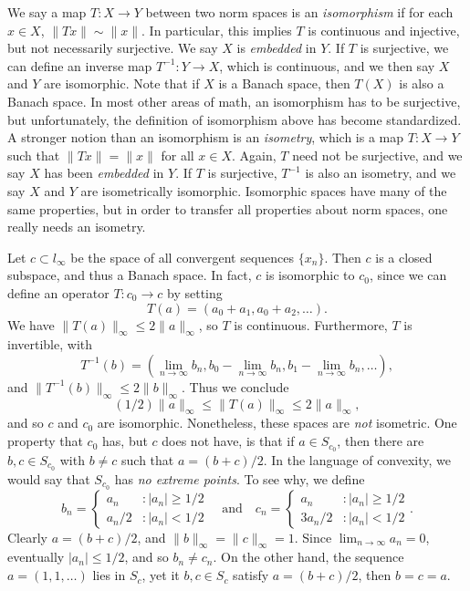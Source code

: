 We say a map $T: X \to Y$ between two norm spaces is an {\it isomorphism} if for each $x \in X$, $\| Tx \| \sim \| x \|$. In particular, this implies $T$ is continuous and injective, but not necessarily surjective. We say $X$ is {\it embedded} in $Y$. If $T$ is surjective, we can define an inverse map $T^{-1}: Y \to X$, which is continuous, and we then say $X$ and $Y$ are isomorphic. Note that if $X$ is a Banach space, then $T(X)$ is also a Banach space. In most other areas of math, an isomorphism has to be surjective, but unfortunately, the definition of isomorphism above has become standardized. A stronger notion than an isomorphism is an {\it isometry}, which is a map $T: X \to Y$ such that $\| Tx \| = \| x \|$ for all $x \in X$. Again, $T$ need not be surjective, and we say $X$ has been {\it embedded} in $Y$. If $T$ is surjective, $T^{-1}$ is also an isometry, and we say $X$ and $Y$ are isometrically isomorphic. Isomorphic spaces have many of the same properties, but in order to transfer all properties about norm spaces, one really needs an isometry.

\begin{example}
    Let $c \subset l_\infty$ be the space of all convergent sequences $\{ x_n \}$. Then $c$ is a closed subspace, and thus a Banach space. In fact, $c$ is isomorphic to $c_0$, since we can define an operator $T: c_0 \to c$ by setting
    \[ T(a) = (a_0 + a_1,a_0 + a_2,\dots). \]
    We have $\| T(a) \|_\infty \leq 2 \| a \|_\infty$, so $T$ is continuous. Furthermore, $T$ is invertible, with
    \[ T^{-1}(b) = \left( \lim_{n \to \infty} b_n, b_0 - \lim_{n \to \infty} b_n, b_1 - \lim_{n \to \infty} b_n, \dots \right), \]
    and $\| T^{-1}(b) \|_\infty \leq 2 \| b \|_\infty$. Thus we conclude
    \[ (1/2) \| a \|_\infty \leq \| T(a) \|_\infty \leq 2 \| a \|_\infty, \]
    and so $c$ and $c_0$ are isomorphic. Nonetheless, these spaces are {\it not} isometric. One property that $c_0$ has, but $c$ does not have, is that if $a \in S_{c_0}$, then there are $b, c \in S_{c_0}$ with $b \neq c$ such that $a = (b + c)/2$. In the language of convexity, we would say that $S_{c_0}$ has {\it no extreme points}. To see why, we define
    \[ b_n = \begin{cases} a_n &: |a_n| \geq 1/2 \\ a_n/2 &: |a_n| < 1/2 \end{cases}\quad\text{and}\quad c_n = \begin{cases} a_n &: |a_n| \geq 1/2 \\ 3a_n/2 &: |a_n| < 1/2 \end{cases}. \]
    Clearly $a = (b+c)/2$, and $\| b \|_\infty = \| c \|_\infty = 1$. Since $\lim_{n \to \infty} a_n = 0$, eventually $|a_n| \leq 1/2$, and so $b_n \neq c_n$. On the other hand, the sequence $a = (1,1,\dots)$ lies in $S_c$, yet it $b,c \in S_c$ satisfy $a = (b + c)/2$, then $b = c = a$.
\end{example}

